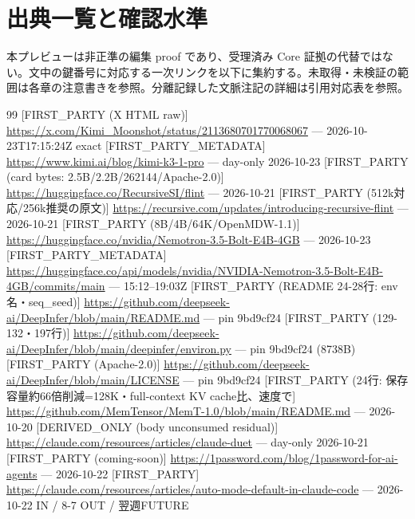 \documentclass[lualatex,a4paper,10pt]{jlreq}
\begin{document}
\clearpage
\section*{出典一覧と確認水準}
本プレビューは非正準の編集 proof であり、受理済み Core 証拠の代替ではない。文中の鍵番号に対応する一次リンクを以下に集約する。未取得・未検証の範囲は各章の注意書きを参照。分離記録した文脈注記の詳細は引用対応表を参照。

{\footnotesize\setlength{\itemsep}{2pt}\setlength{\parsep}{0pt}
\begin{thebibliography}{99}
 [FIRST\_PARTY (X HTML raw)] \url{https://x.com/Kimi_Moonshot/status/2113680701770068067} --- 2026-10-23T17:15:24Z exact
 [FIRST\_PARTY\_METADATA] \url{https://www.kimi.ai/blog/kimi-k3-1-pro} --- day-only 2026-10-23
 [FIRST\_PARTY (card bytes: 2.5B/2.2B/262144/Apache-2.0)] \url{https://huggingface.co/RecursiveSI/flint} --- 2026-10-21
 [FIRST\_PARTY (512k対応/256k推奨の原文)] \url{https://recursive.com/updates/introducing-recursive-flint} --- 2026-10-21
 [FIRST\_PARTY (8B/4B/64K/OpenMDW-1.1)] \url{https://huggingface.co/nvidia/Nemotron-3.5-Bolt-E4B-4GB} --- 2026-10-23
 [FIRST\_PARTY\_METADATA] \url{https://huggingface.co/api/models/nvidia/NVIDIA-Nemotron-3.5-Bolt-E4B-4GB/commits/main} --- 15:12–19:03Z
 [FIRST\_PARTY (README 24-28行: env名・seq\_seed)] \url{https://github.com/deepseek-ai/DeepInfer/blob/main/README.md} --- pin 9bd9cf24
 [FIRST\_PARTY (129-132・197行)] \url{https://github.com/deepseek-ai/DeepInfer/blob/main/deepinfer/environ.py} --- pin 9bd9cf24 (8738B)
 [FIRST\_PARTY (Apache-2.0)] \url{https://github.com/deepseek-ai/DeepInfer/blob/main/LICENSE} --- pin 9bd9cf24
 [FIRST\_PARTY (24行: 保存容量約66倍削減=128K・full-context KV cache比、速度で] \url{https://github.com/MemTensor/MemT-1.0/blob/main/README.md} --- 2026-10-20
 [DERIVED\_ONLY (body unconsumed residual)] \url{https://claude.com/resources/articles/claude-duet} --- day-only 2026-10-21
 [FIRST\_PARTY (coming-soon)] \url{https://1password.com/blog/1password-for-ai-agents} --- 2026-10-22
 [FIRST\_PARTY] \url{https://claude.com/resources/articles/auto-mode-default-in-claude-code} --- 2026-10-22 IN / 8-7 OUT / 翌週FUTURE

\end{thebibliography}}
\end{document}
